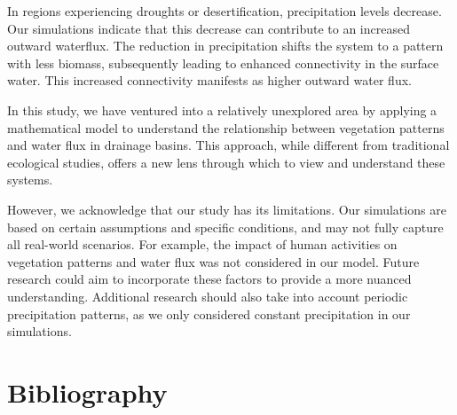\documentclass{article}
\numberwithin{equation}{section}
\begin{document}
In regions experiencing droughts or desertification, precipitation levels decrease. Our simulations indicate that this decrease can contribute to an increased outward waterflux. The reduction in precipitation shifts the system to a pattern with less biomass, subsequently leading to enhanced connectivity in the surface water. This increased connectivity manifests as higher outward water flux.

In this study, we have ventured into a relatively unexplored area by applying a mathematical model to understand the relationship between vegetation patterns and water flux in drainage basins. This approach, while different from traditional ecological studies, offers a new lens through which to view and understand these systems.

However, we acknowledge that our study has its limitations. Our simulations are based on certain assumptions and specific conditions, and may not fully capture all real-world scenarios. For example, the impact of human activities on vegetation patterns and water flux was not considered in our model. Future research could aim to incorporate these factors to provide a more nuanced understanding.
Additional research should also take into account periodic precipitation patterns, as we only considered constant precipitation in our simulations.

\section{Bibliography}
\printbibliography
\end{document}
